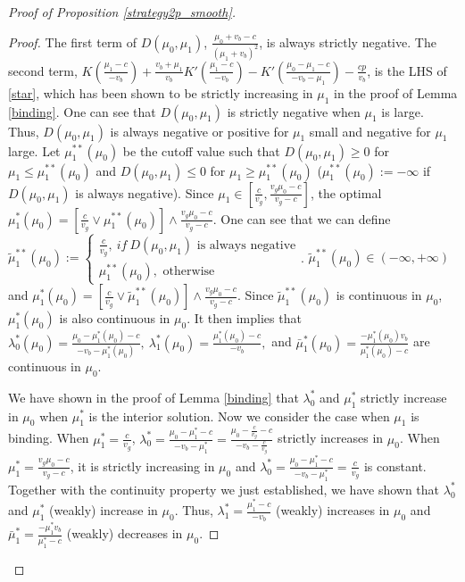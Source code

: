\documentclass[11pt]{extarticle}
\newcommand{\m}{\wedge}
\newcommand{\M}{\vee}
\begin{document}
\begin{proof}[Proof of Proposition \ref{strategy2p_smooth}]
\begin{enumerate}
\begin{proof}
			\normalsize
			The first term of $D(\mu_0, \mu_1)$, $\frac{\mu_0+v_b-c}{(\mu_1+v_b)^2}$, is always strictly negative. The second term, $K(\frac{\mu_1-c}{-v_b})+\frac{v_b+\mu_1}{v_b} K'(\frac{\mu_1-c}{-v_b})-K'(\frac{\mu_0-\mu_1-c}{-v_b-\mu_1})-\frac{cp}{v_b}$, is the LHS of \eqref{star}, which has been shown to be strictly increasing in $\mu_1$ in the proof of Lemma \ref{binding}. One can see that $D(\mu_0, \mu_1)$ is strictly negative when $\mu_1$ is large. Thus, $D(\mu_0, \mu_1)$ is always negative or positive for $\mu_1$ small and negative for $\mu_1$ large. Let $\mu_1^{**}(\mu_0)$ be the cutoff value such that $D(\mu_0, \mu_1) \geq 0$ for $\mu_1 \leq \mu_1^{**}(\mu_0)$ and $D(\mu_0, \mu_1) \leq 0$ for $\mu_1 \geq \mu_1^{**}(\mu_0)$ ($\mu_1^{**}(\mu_0) := -\infty$ if $D(\mu_0, \mu_1)$ is always negative). Since $\mu_1\in \left[\frac{c}{v_g}, \frac{v_g\mu_0-c}{v_g-c} \right]$, the optimal $\mu_1^*(\mu_0) = \left[\frac{c}{v_g} \M \mu_1^{**}(\mu_0)\right] \m \frac{v_g\mu_0-c}{v_g-c}$. One can see that we can define $\tilde{\mu}_1^{**}(\mu_0) := \begin{cases}
			\frac{c}{v_g},~if~D(\mu_0, \mu_1) \text{ is always negative}\\
			\mu_1^{**}(\mu_0),\text{ otherwise}
			\end{cases}$. $\tilde{\mu}_1^{**}(\mu_0) \in (-\infty, + \infty)$ and $\mu_1^*(\mu_0) = \left[\frac{c}{v_g} \M \tilde{\mu}_1^{**}(\mu_0)\right] \m \frac{v_g\mu_0-c}{v_g-c}$. Since $\tilde{\mu}_1^{**}(\mu_0)$ is continuous in $\mu_0$, $\mu_1^*(\mu_0)$ is also continuous in $\mu_0$. It then implies that $\lambda_0^*(\mu_0) = \frac{\mu_0-\mu_1^*(\mu_0)-c}{-v_b-\mu_1^*(\mu_0)},~\lambda_1^*(\mu_0) = \frac{\mu_1^*(\mu_0) - c}{-v_b},$ and $\bar{\mu}_1^*(\mu_0) = \frac{- \mu_1^*(\mu_0) v_b}{\mu_1^*(\mu_0) - c}$ are continuous in $\mu_0$.
			
			We have shown in the proof of Lemma \ref{binding} that $\lambda_0^*$ and $\mu_1^*$ strictly increase in $\mu_0$ when $\mu_1^*$ is the interior solution. Now we consider the case when $\mu_1$ is binding. When $\mu_1^* = \frac{c}{v_g}$, $\lambda_0^* = \frac{\mu_0-\mu_1^*-c}{-v_b-\mu_1^*} = \frac{\mu_0-\frac{c}{v_g}-c}{-v_b-\frac{c}{v_g}}$ strictly increases in $\mu_0$. When $\mu_1^* = \frac{v_g\mu_0-c}{v_g-c}$, it is strictly increasing in $\mu_0$ and $\lambda_0^* = \frac{\mu_0-\mu_1^*-c}{-v_b-\mu_1^*} = \frac{c}{v_g}$ is constant. Together with the continuity property we just established, we have shown that $\lambda_0^*$ and $\mu_1^*$ (weakly) increase in $\mu_0$. Thus, $\lambda_1^* = \frac{\mu_1^* - c}{-v_b}$ (weakly) increases in $\mu_0$ and $\bar{\mu}_1^* = \frac{- \mu_1^* v_b}{\mu_1^* - c}$ (weakly) decreases in $\mu_0$.
		\end{proof}
		

\end{enumerate}
\end{proof}
\end{document}
